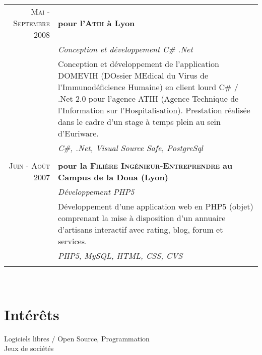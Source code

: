 \documentclass[a4paper,10pt]{article}
\begin{document}
\begin{supertabular}{r|p{11cm}}
  \textsc{Mai - Septembre 2008}
  & \textbf{pour l'\textsc{Atih} à Lyon}                                                                                 \\
  & \emph{Conception et développement C\# .Net}                                                                          \\
  & \footnotesize{Conception et développement de l’application DOMEVIH (DOssier MEdical du Virus de l’Immunodéficience Humaine) en client lourd C\# / .Net 2.0 pour l’agence ATIH (Agence Technique de l'Information sur l'Hospitalisation). Prestation réalisée dans le cadre d'un stage à temps plein au sein d'Euriware.}    \\
  & \emph{C\#, .Net, Visual Source Safe, PostgreSql}                                                                     \\
                                                                                                     \\
  \textsc{Juin - Août 2007}
  & \textbf{pour la \textsc{Filière Ingénieur-Entreprendre} au Campus de la Doua (Lyon)}                                 \\
  & \emph{Développement PHP5}                                                                                            \\
  & \footnotesize{Développement d’une application web en PHP5 (objet) comprenant la mise à disposition d’un annuaire d’artisans interactif avec rating, blog, forum et services.}    \\
  & \emph{PHP5, MySQL, HTML, CSS, CVS}                                                                                   \\
                                                                                                     \\
\end{supertabular}
\\
\section{Intérêts}
Logiciels libres / Open Source, Programmation \\
Jeux de sociétés
\end{document}

